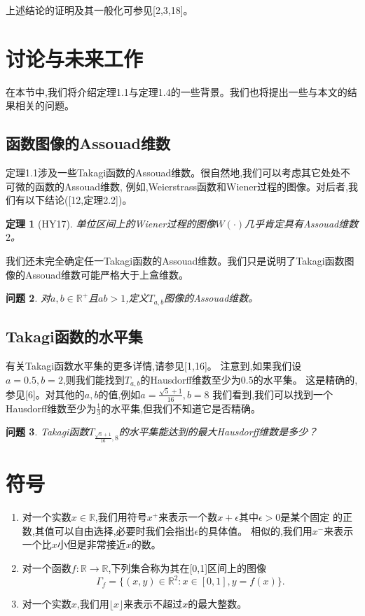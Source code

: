 \documentclass[12pt,a4paper]{article}
\newtheorem{theorem}{定理}[section]
\newtheorem{question}[theorem]{问题}
\begin{document}
      上述结论的证明及其一般化可参见[2,3,18]。

      \section{讨论与未来工作}
      在本节中,我们将介绍定理1.1与定理1.4的一些背景。我们也将提出一些与本文的结果相关的问题。

      \subsection{函数图像的Assouad维数}
      定理1.1涉及一些Takagi函数的Assouad维数。很自然地,我们可以考虑其它处处不可微的函数的Assouad维数,
      例如,Weierstrass函数和Wiener过程的图像。对后者,我们有以下结论([12,定理2.2])。

      \begin{theorem}[HY17]
            单位区间上的Wiener过程的图像$W(\cdot)$几乎肯定具有Assouad维数$2$。
      \end{theorem}

      我们还未完全确定任一Takagi函数的Assouad维数。我们只是说明了Takagi函数图像的Assouad维数可能严格大于上盒维数。

      \begin{question}
            对$a,b\in\mathbb{R}^+$且$ab>1$,定义$T_{a,b}$图像的Assouad维数。
      \end{question}

      \subsection{Takagi函数的水平集}
      有关Takagi函数水平集的更多详情,请参见[1,16]。
      注意到,如果我们设$a=0.5,b=2$,则我们能找到$T_{a,b}$的Hausdorff维数至少为0.5的水平集。
      这是精确的,参见[6]。对其他的$a,b$的值,例如$a=\frac{\sqrt{5}+1}{16},b=8$
      我们看到,我们可以找到一个Hausdorff维数至少为$\frac{1}{3}$的水平集,但我们不知道它是否精确。

      \begin{question}
            Takagi函数$T_{\frac{\sqrt{5}+1}{16},8}$的水平集能达到的最大Hausdorff维数是多少？
      \end{question}

      \section{符号}
      \begin{enumerate}
            \item 对一个实数$x\in\mathbb{R}$,我们用符号$x^+$来表示一个数$x+\epsilon$其中$\epsilon>0$是某个固定
                  的正数,其值可以自由选择,必要时我们会指出$\epsilon$的具体值。
                  相似的,我们用$x^-$来表示一个比$x$小但是非常接近$x$的数。
            \item 对一个函数$f:\mathbb{R}\rightarrow\mathbb{R}$,下列集合称为其在[0,1]区间上的图像
                  $$
                        \Gamma_f=\{(x,y)\in\mathbb{R}^2:x\in[0,1],y=f(x)\}.
                  $$
            \item 对一个实数$x$,我们用$\lfloor x\rfloor$来表示不超过$x$的最大整数。
      \end{enumerate}
\end{document}
